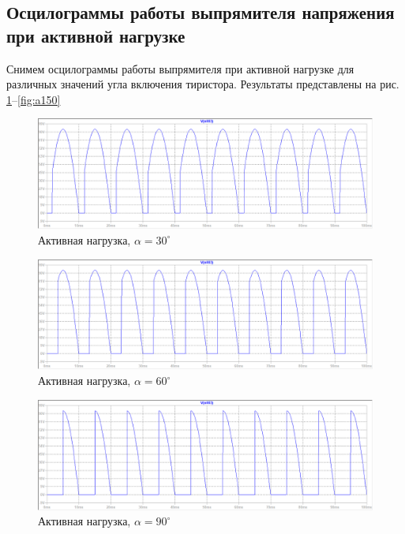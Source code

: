 \documentclass[a4paper, 12pt]{article}
\begin{document}
    \subsection{Осцилограммы работы выпрямителя напряжения при активной нагрузке}
    Снимем осцилограммы работы выпрямителя при активной нагрузке для различных значений
    угла включения тиристора. Результаты представлены на рис. \ref{fig:a30}--\ref{fig:a150}
    \begin{figure}[H]
        \centering
        \includegraphics[scale=0.45]{a30.png}
        \captionsetup{skip=0pt}
        \caption{Активная нагрузка, $\alpha=30^{\circ}$}
        \label{fig:a30}
    \end{figure}
    \begin{figure}[H]
        \centering
        \includegraphics[scale=0.45]{a60.png}
        \captionsetup{skip=0pt}
        \caption{Активная нагрузка, $\alpha=60^{\circ}$}
        \label{fig:a60}
    \end{figure}
    \begin{figure}[H]
        \centering
        \includegraphics[scale=0.45]{a90.png}
        \captionsetup{skip=0pt}
        \caption{Активная нагрузка, $\alpha=90^{\circ}$}
        \label{fig:a90}
    \end{figure}
\end{document}
